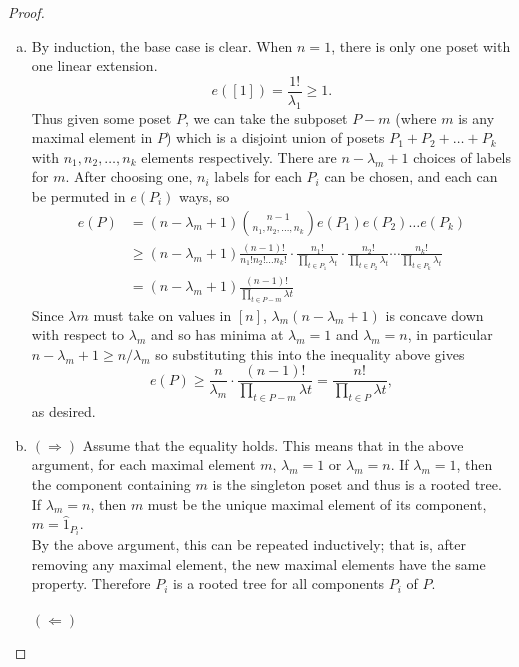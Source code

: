 \documentclass{article}
\begin{document}
\begin{proof}
  \begin{enumerate}[a.]
    \item By induction, the base case is clear. When $n=1$, there is only
    one poset with one linear extension. \[
      e([1]) = \frac{1!}{\lambda_{1}} \geq 1.
    \]
    Thus given some poset $P$, we can take the subposet $P - m$ (where $m$ is
    any maximal element in $P$) which is a disjoint union of posets
    $P_1 + P_2 + \hdots + P_k$ with $n_1, n_2, \hdots, n_k$ elements respectively.
    There are $n - \lambda_m + 1$ choices of labels for $m$. After choosing one,
    $n_i$ labels for each $P_i$ can be chosen, and each can be
    permuted in $e(P_i)$ ways, so \begin{align*}
      e(P) &= (n - \lambda_m + 1)\binom{n - 1}{n_1, n_2, \hdots, n_k}e(P_1)e(P_2)\hdots e(P_k) \\
      &\geq (n - \lambda_m + 1)
      \frac{(n - 1)!}{n_1! n_2! \hdots n_k!} \cdot
      \frac{n_1!}{\prod_{t \in P_1} \lambda_t}\cdot
      \frac{n_2!}{\prod_{t \in P_2} \lambda_t}
      \cdots
      \frac{n_k!}{\prod_{t \in P_k} \lambda_t} \\
      &= (n - \lambda_m + 1)\frac{(n-1)!}{\prod_{t\in P- m} \lambda t}
    \end{align*}
    Since $\lambda m$ must take on values in $[n]$,
    $\lambda_m(n - \lambda_m + 1)$ is concave down with respect to $\lambda_m$
    and so has minima at $\lambda_m = 1$ and $\lambda_m = n$, in particular
    $n - \lambda_m + 1 \geq n/\lambda_m$ so substituting this into the
    inequality above gives \[
    e(P) \geq \frac{n}{\lambda_m}\cdot \frac{(n-1)!}{\prod_{t\in P- m} \lambda t}
    = \frac{n!}{\prod_{t\in P} \lambda t},
    \] as desired.
    \item $(\Longrightarrow)$
    Assume that the equality holds. This means that in the above argument, for
    each maximal element $m$, $\lambda_m = 1$ or $\lambda_m = n$.
    If $\lambda_m = 1$, then the component containing $m$ is the singleton poset
    and thus is a rooted tree. If $\lambda_m = n$, then $m$ must be the unique
    maximal element of its component, $m = \hat 1_{P_i}$.
    \\
    By the above argument, this can be repeated inductively; that is, after
    removing any maximal element, the new maximal elements have the same
    property. Therefore $P_i$ is a rooted tree for all components $P_i$ of $P$.
    \\~\\
    $(\Longleftarrow)$

\end{enumerate}
\end{proof}
\end{document}
